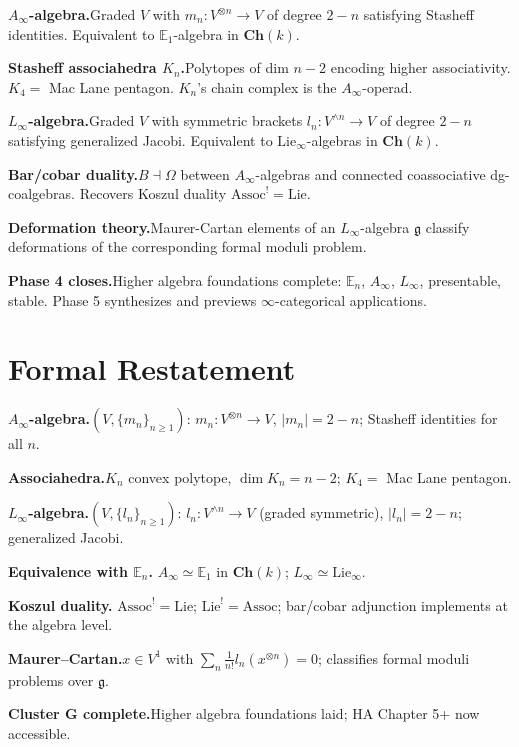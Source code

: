 \begin{summarybox}
\textbf{$A_\infty$-algebra.}\quad Graded $V$ with $m_n : V^{\otimes n} \to V$
of degree $2-n$ satisfying Stasheff identities. Equivalent to
$\mathbb{E}_1$-algebra in $\mathbf{Ch}(k)$.

\textbf{Stasheff associahedra $K_n$.}\quad Polytopes of dim $n-2$
encoding higher associativity. $K_4 = $ Mac Lane pentagon. $K_n$'s
chain complex is the $A_\infty$-operad.

\textbf{$L_\infty$-algebra.}\quad Graded $V$ with symmetric brackets
$l_n : V^{\wedge n} \to V$ of degree $2-n$ satisfying generalized
Jacobi. Equivalent to $\mathrm{Lie}_\infty$-algebras in $\mathbf{Ch}(k)$.

\textbf{Bar/cobar duality.}\quad $B \dashv \Omega$ between
$A_\infty$-algebras and connected coassociative dg-coalgebras.
Recovers Koszul duality $\mathrm{Assoc}^! = \mathrm{Lie}$.

\textbf{Deformation theory.}\quad Maurer-Cartan elements of an
$L_\infty$-algebra $\mathfrak{g}$ classify deformations of the
corresponding formal moduli problem.

\textbf{Phase 4 closes.}\quad Higher algebra foundations complete:
$\mathbb{E}_n$, $A_\infty$, $L_\infty$, presentable, stable. Phase 5
synthesizes and previews $\infty$-categorical applications.
\end{summarybox}


\section*{Formal Restatement}

\begin{formalrestatement}
\textbf{$A_\infty$-algebra.}\quad $(V, \{m_n\}_{n \geq 1})$:
$m_n : V^{\otimes n} \to V$, $|m_n| = 2-n$; Stasheff identities for
all $n$.

\medskip
\textbf{Associahedra.}\quad $K_n$ convex polytope, $\dim K_n = n-2$;
$K_4 = $ Mac Lane pentagon.

\medskip
\textbf{$L_\infty$-algebra.}\quad $(V, \{l_n\}_{n \geq 1})$:
$l_n : V^{\wedge n} \to V$ (graded symmetric), $|l_n| = 2-n$;
generalized Jacobi.

\medskip
\textbf{Equivalence with $\mathbb{E}_n$.}\quad
$A_\infty \simeq \mathbb{E}_1$ in $\mathbf{Ch}(k)$;
$L_\infty \simeq \mathrm{Lie}_\infty$.

\medskip
\textbf{Koszul duality.}\quad
$\mathrm{Assoc}^! = \mathrm{Lie}$;
$\mathrm{Lie}^! = \mathrm{Assoc}$;
bar/cobar adjunction implements at the algebra level.

\medskip
\textbf{Maurer–Cartan.}\quad $x \in V^1$ with
$\sum_n \tfrac{1}{n!} l_n(x^{\otimes n}) = 0$; classifies formal moduli
problems over $\mathfrak{g}$.

\medskip
\textbf{Cluster G complete.}\quad Higher algebra foundations laid;
HA Chapter 5+ now accessible.
\end{formalrestatement}
